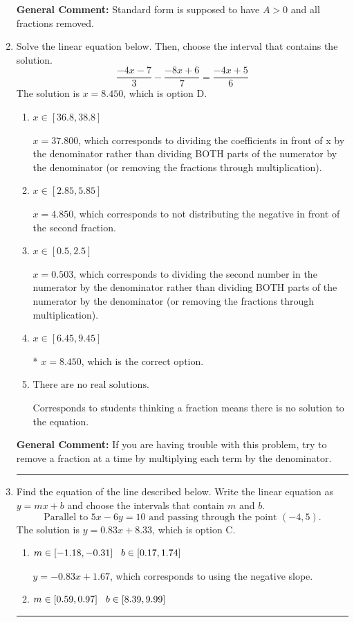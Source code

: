 \documentclass{extbook}[14pt]
\newcommand{\litem}[1]{\item #1

\rule{\textwidth}{0.4pt}}
\begin{document}
\begin{enumerate}
{\textbf{General Comment:} Standard form is supposed to have $A > 0$ and all fractions removed.
}
\litem{
Solve the linear equation below. Then, choose the interval that contains the solution.
\[ \frac{-4x -7}{3} - \frac{-8x + 6}{7} = \frac{-4x + 5}{6} \]
The solution is \( x = 8.450 \), which is option D.\begin{enumerate}[label=\Alph*.]
\item \( x \in [36.8, 38.8] \)

 $x = 37.800$, which corresponds to dividing the coefficients in front of x by the denominator rather than dividing BOTH parts of the numerator by the denominator (or removing the fractions through multiplication).
\item \( x \in [2.85, 5.85] \)

 $x = 4.850$, which corresponds to not distributing the negative in front of the second fraction.
\item \( x \in [0.5, 2.5] \)

 $x = 0.503$, which corresponds to dividing the second number in the numerator by the denominator rather than dividing BOTH parts of the numerator by the denominator (or removing the fractions through multiplication).
\item \( x \in [6.45, 9.45] \)

* $x = 8.450$, which is the correct option.
\item \( \text{There are no real solutions.} \)

Corresponds to students thinking a fraction means there is no solution to the equation.
\end{enumerate}

\textbf{General Comment:} If you are having trouble with this problem, try to remove a fraction at a time by multiplying each term by the denominator.
}
\litem{
Find the equation of the line described below. Write the linear equation as $ y=mx+b $ and choose the intervals that contain $m$ and $b$.
\[ \text{Parallel to } 5 x - 6 y = 10 \text{ and passing through the point } (-4, 5). \]
The solution is \( y = 0.83x + 8.33 \), which is option C.\begin{enumerate}[label=\Alph*.]
\item \( m \in [-1.18, -0.31] \hspace*{3mm} b \in [0.17, 1.74] \)

 $y = -0.83x + 1.67$, which corresponds to using the negative slope.
\item \( m \in [0.59, 0.97] \hspace*{3mm} b \in [8.39, 9.99] \)


\end{enumerate}}
\end{enumerate}
\end{document}
